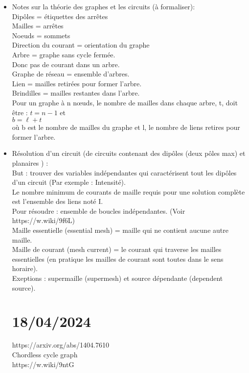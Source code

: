 \documentclass[11pt]{article}
\begin{document}
    \begin{itemize}
	    \item Notes sur la théorie des graphes et les circuits (à formaliser): \\
   Dipôles = étiquettes des arrêtes \\
   Mailles = arrêtes \\
   Noeuds = sommets \\
   Direction du courant = orientation du graphe \\
   
   Arbre = graphe sans cycle fermée. \\
   Donc pas de courant dans un arbre. \\
   Graphe de réseau = ensemble d'arbres. \\
   Lien = mailles retirées pour former l'arbre. \\
   Brindilles = mailles restantes dans l'arbre. \\
   Pour un graphe à n nœuds, le nombre de mailles dans chaque arbre, t, doit être : 
   $\displaystyle t=n-1 $ et \\ 
   $\displaystyle b=\ell +t $ \\
   où b est le nombre de mailles du graphe et l, le nombre de liens 
   retires pour former l'arbre. \\

	\item Résolution d'un circuit (de circuits contenant des dipôles (deux pôles max) et planaires ) : \\
   But : trouver des variables indépendantes qui caractérisent tout les dipôles d'un circuit (Par exemple : Intensité). \\
   Le nombre minimum de courants de maille requis pour une solution complète est l'ensemble des liens noté I. \\
   Pour résoudre : ensemble de boucles indépendantes. (Voir https://w.wiki/9f6L) \\
   Maille essentielle (essential mesh) = maille qui ne contient aucune autre maille. \\
   Maille de courant (mesh current) = le courant qui traverse les mailles essentielles (en pratique les mailles de courant sont toutes dans le sens horaire). \\
   Exeptions : supermaille (supermesh) et source dépendante (dependent source). \\

\section{18/04/2024}
 https://arxiv.org/abs/1404.7610 \\
Chordless cycle graph \\
https://w.wiki/9ntG \\

	
   

    \end{itemize}

    
\end{document}
